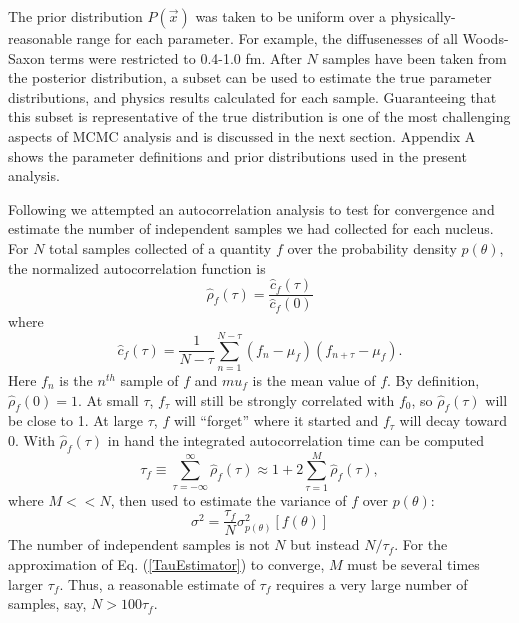 \documentclass[twocolumn,secnumarabic,amssymb, nobibnotes, aps, prl,
superscriptaddress, nobalancelastpage]{revtex4}
\begin{document}
The prior distribution $P(\vec{x})$ was taken to be uniform over a
physically-reasonable range for each parameter. For example, the
diffusenesses of all Woods-Saxon terms were restricted to 0.4-1.0 fm.
After $N$ samples have been taken from the posterior distribution,
a subset can be used to estimate the true parameter distributions,
and physics results calculated for each sample. Guaranteeing that this subset is
representative of the true distribution is one of the most challenging aspects
of MCMC analysis and is discussed in the next section. Appendix A
shows the parameter definitions and prior distributions used in the present
analysis.

Following \cite{Foreman-Mackey2013} we attempted an
autocorrelation analysis to test for convergence
and estimate the number of independent samples we had collected for each nucleus.
For $N$ total samples collected of a quantity $f$ over the probability density
$p(\theta)$, the normalized autocorrelation function is
\begin{equation}
    \hat{\rho}_{f}(\tau) = \frac{\hat{c}_{f}(\tau)}{\hat{c}_{f}(0)}
\end{equation}
where
\begin{equation}
    \hat{c}_{f}(\tau) = \frac{1}{N-\tau} \sum_{n=1}^{N-\tau}
    (f_{n}-\mu_{f})(f_{n+\tau}-\mu_{f}).
\end{equation}
Here $f_{n}$ is the $n^{th}$ sample of $f$ and $mu_{f}$ is the mean value of
$f$. By definition, $\hat{\rho}_{f}(0) = 1$. At small $\tau$, $f_{\tau}$ will still
be strongly correlated with $f_{0}$, so $\hat{\rho}_{f}(\tau)$ will be close to
1. At large $\tau$, $f$ will ``forget'' where it started and $f_{\tau}$ will
decay toward 0. With $\hat{\rho}_{f}(\tau)$ in hand the integrated autocorrelation
time can be computed
\begin{equation}\label{TauEstimator}
    \tau_{f} \equiv \sum_{\tau=-\infty}^{\infty} \hat{\rho}_{f}(\tau) \approx
    1 + 2 \sum_{\tau=1}^{M} \hat{\rho}_{f}(\tau),
\end{equation}
where $M << N$, then used to estimate the variance of $f$ over $p(\theta)$:
\begin{equation}\label{VarianceEstimator}
    \sigma^{2} = \frac{\tau_{f}}{N}\sigma^{2}_{p(\theta)}[f(\theta)]
\end{equation}
The number of independent samples is not $N$ but instead
$N/\tau_{f}$. For the approximation of Eq. (\ref{TauEstimator}) to
converge, $M$ must be several times larger $\tau_{f}$. Thus, a reasonable
estimate of $\tau_{f}$ requires a very large number of samples, say, $N > 100\tau_{f}$.
\end{document}
